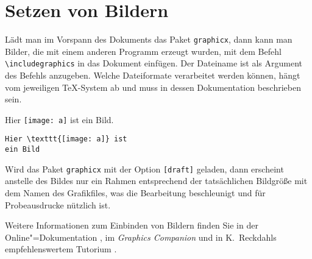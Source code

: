 
\section{Setzen von Bildern} \label{graphics}
Lädt man im Vorspann des Dokuments das Paket \texttt{graphicx},
dann kann man Bilder, die mit einem anderen Programm erzeugt wurden, 
mit dem Befehl \verb|\includegraphics| in das Dokument einfügen.
Der Dateiname ist als Argument des Befehls anzugeben.
Welche Dateiformate verarbeitet werden können, hängt vom jeweiligen
\TeX-System ab und muss in dessen Dokumentation beschrieben sein.

\exa
Hier \texttt{[image: a]} ist ein Bild.
\exb
\begin{verbatim}
Hier \texttt{[image: a]} ist
ein Bild
\end{verbatim}
\exc{}
Wird das Paket \texttt{graphicx} mit der Option \texttt{[draft]} geladen,
dann erscheint anstelle des Bildes nur ein Rahmen entsprechend
der tatsächlichen Bildgröße mit dem Namen des Grafikfiles, 
was die Bearbeitung beschleunigt und für Probeausdrucke nützlich ist.

Weitere Informationen zum Einbinden von Bildern finden Sie in der
Online"=Dokumentation \cite{grfguide}, im \textit{Graphics Companion}
\cite{grfcomp} und in K.~Reckdahls empfehlenswertem  Tutorium \cite{epslatex}.



